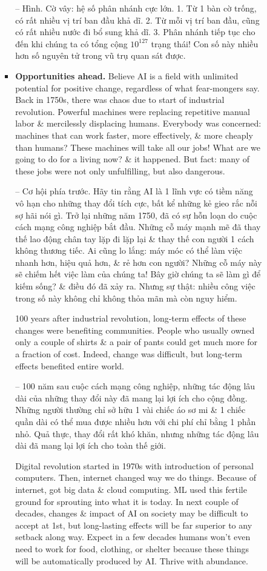 \documentclass{article}
\begin{document}
\begin{itemize}
\begin{itemize}
\begin{itemize}
\begin{itemize}
                -- {\sf Hình. Cờ vây: hệ số phân nhánh cực lớn.} 1. Từ 1 bàn cờ trống, có rất nhiều vị trí ban đầu khả dĩ. 2. Từ mỗi vị trí ban đầu, cũng có rất nhiều nước đi bổ sung khả dĩ. 3. Phân nhánh tiếp tục cho đến khi chúng ta có tổng cộng $10^{127}$ trạng thái! Con số này nhiều hơn số nguyên tử trong vũ trụ quan sát được.
                \item {\bf Opportunities ahead.} Believe AI is a field with unlimited potential for positive change, regardless of what fear-mongers say. Back in 1750s, there was chaos due to start of industrial revolution. Powerful machines were replacing repetitive manual labor \& mercilessly displacing humans. Everybody was concerned: machines that can work faster, more effectively, \& more cheaply than humans? These machines will take all our jobs! What are we going to do for a living now? \& it happened. But fact: many of these jobs were not only unfulfilling, but also dangerous.

                -- {\sf Cơ hội phía trước.} Hãy tin rằng AI là 1 lĩnh vực có tiềm năng vô hạn cho những thay đổi tích cực, bất kể những kẻ gieo rắc nỗi sợ hãi nói gì. Trở lại những năm 1750, đã có sự hỗn loạn do cuộc cách mạng công nghiệp bắt đầu. Những cỗ máy mạnh mẽ đã thay thế lao động chân tay lặp đi lặp lại \& thay thế con người 1 cách không thương tiếc. Ai cũng lo lắng: máy móc có thể làm việc nhanh hơn, hiệu quả hơn, \& rẻ hơn con người? Những cỗ máy này sẽ chiếm hết việc làm của chúng ta! Bây giờ chúng ta sẽ làm gì để kiếm sống? \& điều đó đã xảy ra. Nhưng sự thật: nhiều công việc trong số này không chỉ không thỏa mãn mà còn nguy hiểm.

                100 years after industrial revolution, long-term effects of these changes were benefiting communities. People who usually owned only a couple of shirts \& a pair of pants could get much more for a fraction of cost. Indeed, change was difficult, but long-term effects benefited entire world.

                -- 100 năm sau cuộc cách mạng công nghiệp, những tác động lâu dài của những thay đổi này đã mang lại lợi ích cho cộng đồng. Những người thường chỉ sở hữu 1 vài chiếc áo sơ mi \& 1 chiếc quần dài có thể mua được nhiều hơn với chi phí chỉ bằng 1 phần nhỏ. Quả thực, thay đổi rất khó khăn, nhưng những tác động lâu dài đã mang lại lợi ích cho toàn thế giới.

                Digital revolution started in 1970s with introduction of personal computers. Then, internet changed way we do things. Because of internet, got big data \& cloud computing. ML used this fertile ground for sprouting into what it is today. In next couple of decades, changes \& impact of AI on society may be difficult to accept at 1st, but long-lasting effects will be far superior to any setback along way. Expect in a few decades humans won't even need to work for food, clothing, or shelter because these things will be automatically produced by AI. Thrive with abundance.


\end{itemize}
\end{itemize}
\end{itemize}
\end{itemize}
\end{document}
